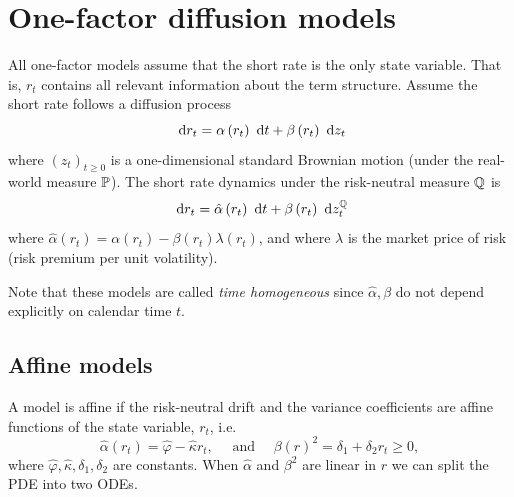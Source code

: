 \chapter{One-factor diffusion models}
All one-factor models assume that the short rate is the only state variable. That is, $r_t$ contains
all relevant information about the term structure. Assume the short rate follows a diffusion
process
\[
\d  r_{t}=\alpha\left(r_{t}\right) \d t+\beta\left(r_{t}\right) \d z_{t}
\]
where $\left(z_{t}\right)_{t \geq 0}$ is a one-dimensional standard Brownian motion (under the
real-world measure $\P$). The short rate dynamics under the risk-neutral measure
$\Q$ is
\[
\d  r_{t}=\hat{\alpha}\left(r_{t}\right) \d  t+\beta\left(r_{t}\right) \d  z_{t}^{\Q}
\]
where $\hat{\alpha}\left(r_{t}\right)=\alpha\left(r_{t}\right)-\beta\left(r_{t}\right)
\lambda\left(r_{t}\right)$, and where $\lambda$ is the market price of risk (risk premium per unit
volatility). 

Note that these models are called \emph{time homogeneous} since $\hat{\alpha}, \beta$ do not depend
explicitly on calendar time $t$.

\section{Affine models}
A model is affine if the risk-neutral drift and the variance coefficients are affine functions of
the state variable, $r_t$, i.e. 
\begin{equation}
\hat{\alpha}\left(r_{t}\right)=\hat{\varphi}-\hat{\kappa} r_t, \quad \text { and } \quad
\beta(r)^{2}=\delta_{1}+\delta_{2} r_t \geq 0,
\label{eq:02-affine}
\end{equation}
where $\hat{\varphi}, \hat{\kappa}, \delta_{1}, \delta_{2}$ are constants. When $\hat{\alpha}$ and
$\beta^{2}$ are linear in $r$ we can split the PDE into two ODEs.

